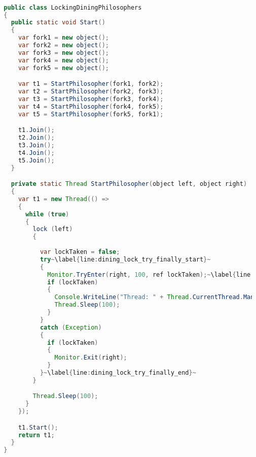 \begin{lstlisting}[label=lst:impl_dining_lock,
  caption={Lock based dining philosophers Iimplementation},
  language=Java,  
  showspaces=false,
  showtabs=false,
  breaklines=true,
  showstringspaces=false,
  breakatwhitespace=true,
  commentstyle=\color{greencomments},
  keywordstyle=\color{bluekeywords},
  stringstyle=\color{redstrings},
  escapechar=~,
  morekeywords={atomic, retry, orelse, var, get, set, ref, out, readonly, virtual, override, lock}]  % Start your code-block

  public class LockingDiningPhilosophers
  {
  	public static void Start()
  	{
      var fork1 = new object();
      var fork2 = new object();
      var fork3 = new object();
      var fork4 = new object();
      var fork5 = new object();

      var t1 = StartPhilosopher(fork1, fork2);
      var t2 = StartPhilosopher(fork2, fork3);
      var t3 = StartPhilosopher(fork3, fork4);
      var t4 = StartPhilosopher(fork4, fork5);
      var t5 = StartPhilosopher(fork5, fork1);

      t1.Join();
      t2.Join();
      t3.Join();
      t4.Join();
      t5.Join();
    }

    private static Thread StartPhilosopher(object left, object right)
    {
      var t1 = new Thread(() =>
      {
        while (true)
        {
          lock (left)
          {
          
            var lockTaken = false;
            try~\label{line:dining_lock_try_finally_start}~
            {
              Monitor.TryEnter(right, 100, ref lockTaken);~\label{line:dining_lock_try}~
              if (lockTaken)
              {
                Console.WriteLine("Thread: " + Thread.CurrentThread.ManagedThreadId + " eating.");
                Thread.Sleep(100);
              }
            }
            catch (Exception)
            {
              if (lockTaken)
              {
                Monitor.Exit(right);
              }
            }~\label{line:dining_lock_try_finally_end}~
          }

          Thread.Sleep(100);
        }
      });

      t1.Start();
      return t1;
    }
  }
  
\end{lstlisting}

